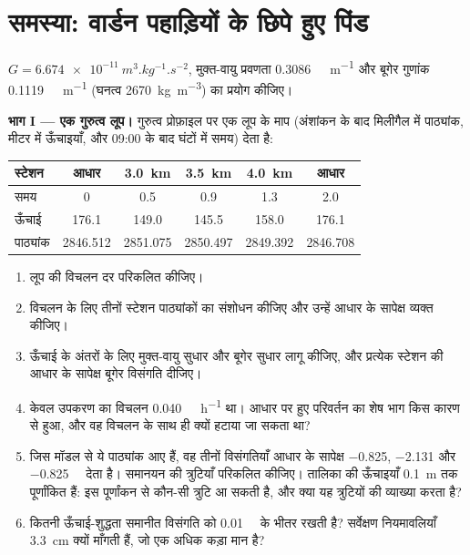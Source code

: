 \section{समस्या: वार्डन पहाड़ियों के छिपे हुए पिंड}

\begin{problem}
\label{pb:b3:field-lab-methods-3:1}
$G = \qty{6.674e-11}{m^3.kg^{-1}.s^{-2}}$, मुक्त-वायु प्रवणता
\qty{0.3086}{\milli\gal.m^{-1}} और बूगेर गुणांक
\qty{0.1119}{\milli\gal.m^{-1}} (घनत्व \qty{2670}{kg.m^{-3}}) का प्रयोग कीजिए।

\medskip\noindent\textbf{भाग I --- एक गुरुत्व लूप।} गुरुत्व प्रोफ़ाइल पर एक लूप
के माप (अंशांकन के बाद मिलीगैल में पाठ्यांक, मीटर में ऊँचाइयाँ,
और 09:00 के बाद घंटों में समय) देता है:
\begin{center}
\small
\begin{tabular}{lccccc}
\hline
स्टेशन & आधार & \qty{3.0}{km} & \qty{3.5}{km} & \qty{4.0}{km} & आधार \\
\hline
समय & 0 & 0.5 & 0.9 & 1.3 & 2.0 \\
ऊँचाई & 176.1 & 149.0 & 145.5 & 158.0 & 176.1 \\
पाठ्यांक & 2846.512 & 2851.075 & 2850.497 & 2849.392 & 2846.708 \\
\hline
\end{tabular}
\end{center}
\begin{enumerate}
\item लूप की विचलन दर परिकलित कीजिए।
\item विचलन के लिए तीनों स्टेशन पाठ्यांकों का संशोधन कीजिए और उन्हें
  आधार के सापेक्ष व्यक्त कीजिए।
\item ऊँचाई के अंतरों के लिए मुक्त-वायु सुधार और बूगेर सुधार लागू कीजिए,
  और प्रत्येक स्टेशन की
  आधार के सापेक्ष बूगेर विसंगति दीजिए।
\item केवल उपकरण का विचलन \qty{0.040}{\milli\gal.h^{-1}} था।
  आधार पर हुए परिवर्तन का शेष भाग किस कारण से हुआ, और वह
  विचलन के साथ ही क्यों हटाया जा सकता था?
\item जिस मॉडल से ये पाठ्यांक आए हैं, वह तीनों विसंगतियाँ
  आधार के सापेक्ष \num{-0.825}, \num{-2.131} और
  \qty{-0.825}{\milli\gal} देता है। समानयन की त्रुटियाँ परिकलित कीजिए। तालिका की
  ऊँचाइयाँ \qty{0.1}{m} तक पूर्णांकित हैं: इस पूर्णांकन से कौन-सी त्रुटि आ सकती है,
  और क्या यह त्रुटियों की व्याख्या करता है?
\item कितनी ऊँचाई-शुद्धता समानीत विसंगति को
  \qty{0.01}{\milli\gal} के भीतर रखती है? सर्वेक्षण नियमावलियाँ
  \qty{3.3}{cm} क्यों माँगती हैं, जो एक अधिक कड़ा मान है?
\end{enumerate}


\end{problem}
